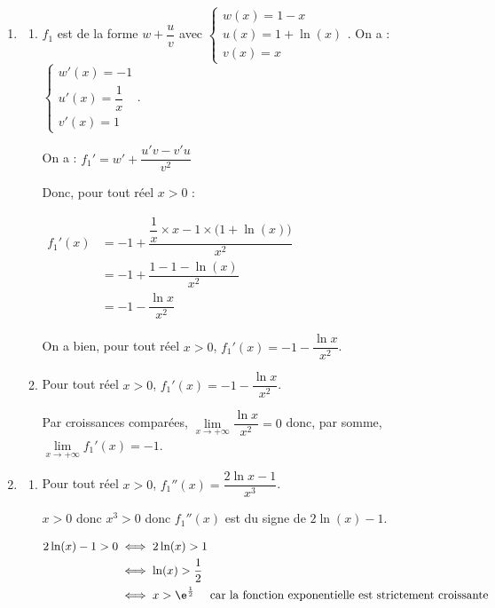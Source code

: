 \begin{enumerate}
	\item \begin{enumerate}
		\item  $f_1$ est de la forme $w + \dfrac{u}{v}$ avec $\begin{cases}w(x)= 1-x \\ u(x)=1+\ln(x) \\ v(x)= x  \end{cases} $.  \quad On a : $\begin{cases}w'(x)= -1 \\ u'(x)=\dfrac{1}{x} \\ v'(x)= 1  \end{cases} $. 
		
		On a : $f_1'= w'+ \dfrac{u'v - v'u}{v^2}$
		
		Donc, pour tout réel $x>0$ : 
		
		$\begin{aligned}
		f_1'(x) &= -1 + \dfrac{\dfrac{1}{x} \times x- 1 \times \big( 1 +\ln(x) \big) }{x^2} \\
		&= -1 + \dfrac{1- 1 -\ln(x)}{x^2} \\
		&= -1-\dfrac{\ln x}{x^2}
		\end{aligned}$
		
		
		
		
		
		On a bien,  pour tout réel $x>0$, \quad  $f_{1}'(x)=-1-\dfrac{\ln x}{x^2}$.
		
		\item  Pour tout réel $x>0$, \quad $f_{1}'(x)=-1-\dfrac{\ln x}{x^2} $. 
		
		
		Par croissances comparées, $	\lim\limits_{x\to +\infty } \dfrac{\ln x}{x^2}  = 0 $  donc, par somme, $\lim\limits_{x \to +\infty } f_1'(x)= - 1$.  
	
	\end{enumerate}
	
	\item 
	
	\begin{enumerate}
		\item  Pour tout réel $x>0$, \quad  $f_{1}''(x)=\dfrac{2 \ln x-1}{x^{3}}$.
		
		
		$x>0$ donc $x^3>0$ donc $f_1''(x)$ est du signe de $2\ln (x) -1$. 
		
		$\begin{aligned}  2\ln (x) -1>0 &\iff 2\ln(x) >1 \\
			&\iff \ln(x) > \dfrac{1}{2} \\
			&\iff x > \e^{\frac{1}{2}} \quad \text{ car la fonction exponentielle est strictement croissante}
			\end{aligned}$
			

\end{enumerate}
\end{enumerate}
